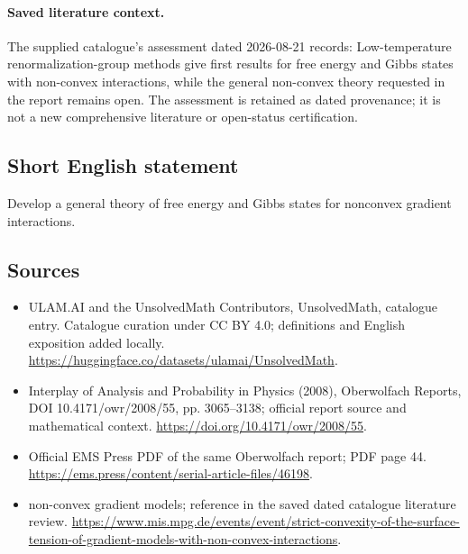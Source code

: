 \documentclass[11pt]{article}
\begin{document}
\paragraph{Saved literature context.} The supplied catalogue's assessment dated 2026-08-21 records: Low-temperature renormalization-group methods give first results for free energy and Gibbs states with non-convex interactions, while the general non-convex theory requested in the report remains open. The assessment is retained as dated provenance; it is not a new comprehensive literature or open-status certification.
\subsection{Short English statement}
Develop a general theory of free energy and Gibbs states for nonconvex gradient interactions.
\subsection{Sources}
\begin{itemize}
\item[\hypertarget{source:statement:1}{S1}] ULAM.AI and the UnsolvedMath Contributors, UnsolvedMath, catalogue entry. Catalogue curation under CC BY 4.0; definitions and English exposition added locally.
\url{https://huggingface.co/datasets/ulamai/UnsolvedMath}.
\item[\hypertarget{source:statement:2}{S2}] Interplay of Analysis and Probability in Physics (2008), Oberwolfach Reports, DOI 10.4171/owr/2008/55, pp. 3065--3138; official report source and mathematical context.
\url{https://doi.org/10.4171/owr/2008/55}.
\item[\hypertarget{source:statement:3}{S3}] Official EMS Press PDF of the same Oberwolfach report; PDF page 44.
\url{https://ems.press/content/serial-article-files/46198}.
\item[\hypertarget{source:statement:4}{S4}] non-convex gradient models; reference in the saved dated catalogue literature review.
\url{https://www.mis.mpg.de/events/event/strict-convexity-of-the-surface-tension-of-gradient-models-with-non-convex-interactions}.
\end{itemize}
\label{end:statement}
\end{document}
